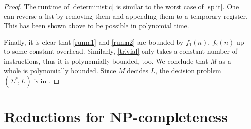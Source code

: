 \documentclass{article}
\begin{document}
\begin{claim*}[c]
\begin{proof}
		The runtime of \ref{deterministic} is similar to the worst case of \ref{split}. One can reverse a list
		by removing them and appending them to a temporary register. This has been shown above to be possible in
		polynomial time.

		Finally, it is clear that \ref{runm1} and \ref{runm2} are bounded by $f_1(n)$, $f_2(n)$ up to some
		constant overhead. Similarly, \ref{trivial} only takes a constant number of instructions, thus it is polynomially bounded, too.
		We conclude that $M$ as a whole is polynomially bounded. Since $M$ decides $L$, the decision problem
		$(\Sigma^*, L)$ is in \nptime.
	\end{proof}
\end{claim*}

\section{Reductions for NP-completeness}
\end{document}
